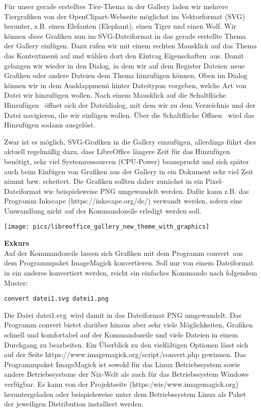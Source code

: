 \documentclass[a4paper,10pt,pagesize,titlepage]{scrbook}
\begin{document}
Für unser gerade erstelltes Tier-Thema  in der Gallery laden wir mehrere Tiergrafiken von der OpenClipart-Webseite möglichst im Vektorformat (SVG) herunter, z.B. einen Elefanten (Elephant), einen Tiger und einen Wolf. Wir können diese Grafiken nun im SVG-Dateiformat in das gerade erstellte Thema der Gallery einfügen. Dazu rufen wir mit einem rechten Mausklick auf das Thema das Kontextmenü auf und wählen dort den Eintrag \glqq Eigenschaften\grqq~aus. Damit gelangen wir wieder in den Dialog, in dem wir auf dem Register \glqq Dateien\grqq~neue Grafiken oder andere Dateien dem Thema hinzufügen können. Oben im Dialog können wir in dem Ausklappmenü hinter Dateitypus vorgeben, welche Art von Datei wir hinzufügen wollen. Nach einem Mausklick auf die Schaltfläche \glqq Hinzufügen\grqq~ öffnet sich der Dateidialog, mit dem wir zu dem Verzeichnis und der Datei navigieren, die wir einfügen wollen. Über die Schaltfläche \glqq Öffnen\grqq~ wird das Hinzufügen sodann ausgelöst.

Zwar ist es möglich, SVG-Grafiken in die Gallery einzufügen, allerdings führt dies aktuell regelmäßig dazu, dass LibreOffice längere Zeit für das Hinzufügen benötigt, sehr viel Systemressourcen (CPU-Power) beansprucht und sich später auch beim Einfügen von Grafiken aus der Gallery in ein Dokument sehr viel Zeit nimmt bzw. scheitert. Die Grafiken sollten daher zunächst in ein Pixel-Dateiformat wie beispielsweise PNG umgewandelt werden. Dafür kann z.B. das Programm Inkscape (https://inkscape.org/de/) verwandt werden, sofern eine Umwandlung nicht auf der Kommandozeile erledigt werden soll.

\begin{center}
	\captionsetup{type=figure}
	\texttt{[image: pics/libreoffice\_gallery\_new\_theme\_with\_graphics]}
	\label{fig:libreoffice_gallery_new_theme_with_graphics}
\end{center}


\bigskip\textbf{Exkurs}
\\

Auf der Kommandozeile lassen sich Grafiken mit dem Programm \glqq convert\grqq~aus dem Programmpaket ImageMagick konvertieren. Soll nur von einem Dateiformat in ein anderes konvertiert werden, reicht ein einfaches Kommando nach folgendem Muster:
\begin{lstlisting}
convert datei1.svg datei1.png
\end{lstlisting}

Die Datei \glqq datei1.svg\grqq~wird damit in das Dateiformat PNG umgewandelt. Das Programm convert bietet darüber hinaus aber sehr viele Möglichkeiten, Grafiken schnell und komfortabel auf der Kommandozeile und viele Dateien in einem Durchgang zu bearbeiten.
Ein Überblick zu den vielfältigen Optionen lässt sich auf der Seite https://www.imagemagick.org/script/convert.php gewinnen. Das Programmpaket ImageMagick ist sowohl für das Linux Betriebssystem sowie andere Betriebssysteme der Nix-Welt als auch für das Betriebssystem Windows verfügbar. Es kann von der Projektseite (https:/wie/www.imagemagick.org) heruntergeladen oder beispielsweise unter dem Betriebssystem Linux als Paket der jeweiligen Distribution installiert werden.
\end{document}
